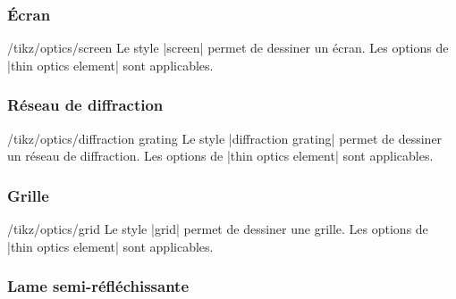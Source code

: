 \documentclass[a4paper]{ltxdoc}
\begin{document}
\subsubsection{Écran}


\begin{stylekey}{/tikz/optics/screen}
Le style |screen| permet de dessiner un écran. Les options de |thin optics element| sont applicables.

\begin{codeexample}[width=6cm]
\end{codeexample}
\end{stylekey}

\subsubsection{Réseau de diffraction}

\begin{stylekey}{/tikz/optics/diffraction grating}
Le style |diffraction grating| permet de dessiner un réseau de diffraction. Les options de |thin optics element| sont applicables.

\begin{codeexample}[width=6cm]
\end{codeexample}
\end{stylekey}

\subsubsection{Grille}

\begin{stylekey}{/tikz/optics/grid}
Le style |grid| permet de dessiner une grille. Les options de |thin optics element| sont applicables.

\begin{codeexample}[width=6cm]
\end{codeexample}
\end{stylekey}

\subsubsection{Lame semi-réfléchissante}
\end{document}
